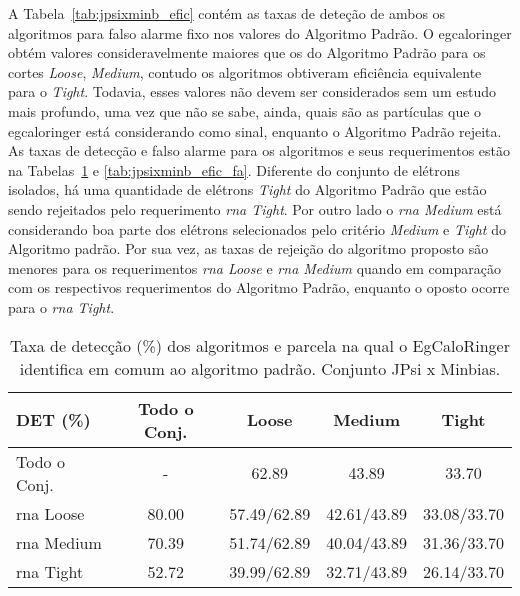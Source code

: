A Tabela~\ref{tab:jpsixminb_efic} contém as taxas de deteção de ambos os
algoritmos para falso alarme fixo nos valores do Algoritmo Padrão. O
\gls{egcaloringer} obtém valores consideravelmente maiores que os do Algoritmo
Padrão para os cortes \emph{Loose}, \emph{Medium}, contudo os algoritmos
obtiveram eficiência equivalente para o \emph{Tight}. Todavia, esses valores não
devem ser considerados sem um estudo mais profundo, uma vez que não se sabe,
ainda, quais são as partículas que o \gls{egcaloringer} está considerando como
sinal, enquanto o Algoritmo Padrão rejeita. As taxas de detecção e falso alarme 
para os algoritmos e seus requerimentos estão na Tabelas~\ref{tab:jpsixminb_efic_det} 
e \ref{tab:jpsixminb_efic_fa}. Diferente do conjunto de elétrons isolados, há
uma quantidade de elétrons \emph{Tight} do Algoritmo Padrão que estão sendo
rejeitados pelo requerimento \emph{\gls{rna} Tight}. Por outro lado o
\emph{\gls{rna} Medium} está considerando boa parte dos elétrons selecionados
pelo critério \emph{Medium} e \emph{Tight} do Algoritmo padrão. Por sua vez, as
taxas de rejeição do algoritmo proposto são menores para os requerimentos
\emph{\gls{rna} Loose} e \emph{\gls{rna} Medium} quando em comparação com os
respectivos requerimentos do Algoritmo Padrão, enquanto o oposto ocorre para o
\emph{\gls{rna} Tight}.


\begin{table}[htb]
\centering
\begin{tabular}{l cccc}
\hline
\hline
DET (\%)& Todo o Conj. & Loose & Medium & Tight \\
\hline
Todo o Conj.      &     -  &  62.89      & 43.89       &  33.70      \\
\hline
\gls{rna} Loose   &  80.00 & 57.49/62.89 & 42.61/43.89 & 33.08/33.70 \\
\hline
\gls{rna} Medium  &  70.39 & 51.74/62.89 & 40.04/43.89 & 31.36/33.70 \\
\hline
\gls{rna} Tight   &  52.72 & 39.99/62.89 & 32.71/43.89 & 26.14/33.70 \\
\hline
\hline
\end{tabular}
\caption{Taxa de detecção (\%) dos algoritmos e parcela na qual o EgCaloRinger
identifica em comum ao algoritmo padrão. Conjunto JPsi x Minbias.}
\label{tab:jpsixminb_efic_det}
\end{table}


